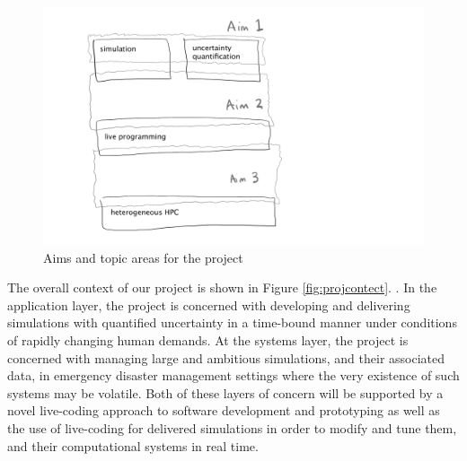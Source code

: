 \begin{figure}
  \begin{center}
    \includegraphics[scale=0.17]{figures/aims-figure.png}%
    \caption{Aims and topic areas for the project }\label{projectFig}
  \end{center}
\end{figure}




%

%

%




%

%





%

\iffalse
The overall context of our project is shown in
Figure \ref{fig:projcontect}.  . In the application layer, the project
is concerned with developing and delivering simulations with
quantified uncertainty in a time-bound manner under conditions of
rapidly changing human demands. At the systems layer, the project is
concerned with managing large and ambitious simulations, and their
associated data, in emergency disaster management settings where the
very existence of such systems may be volatile. Both of these layers
of concern will be supported by a novel live-coding approach to
software development and prototyping as well as the use of live-coding
for delivered simulations in order to modify and tune them, and their
computational systems in real time.



